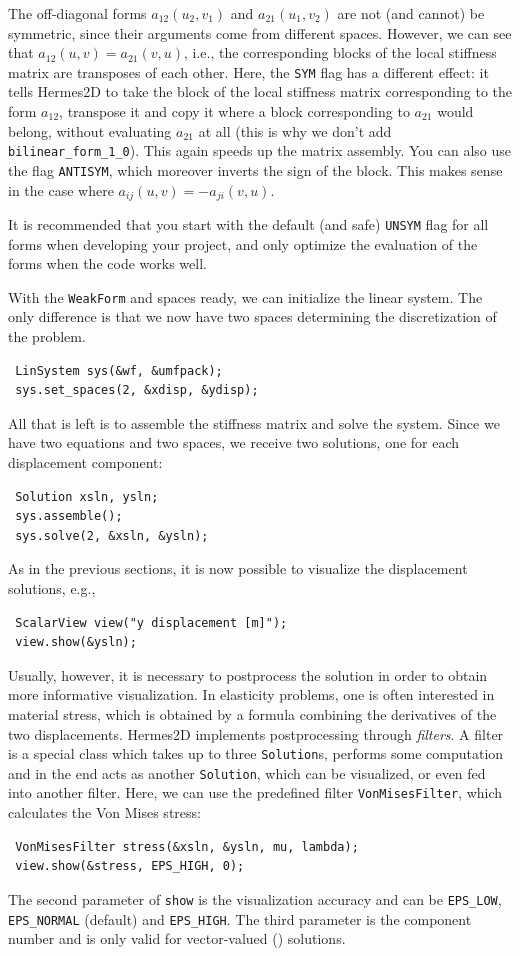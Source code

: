 The off-diagonal forms $a_{12}(u_2, v_1)$ and $a_{21}(u_1, v_2)$ are not
(and cannot) be symmetric, since their arguments come from different spaces.
However, we can see that $a_{12}(u, v) = a_{21}(v, u)$, i.e., the corresponding blocks
of the local stiffness matrix are transposes of each other. Here, the {\tt SYM} flag
has a different effect: it tells Hermes2D to take the block of the local stiffness
matrix corresponding to the form $a_{12}$, transpose it and copy it where a block
corresponding to $a_{21}$ would belong, without evaluating $a_{21}$ at all (this is why
we don't add {\tt bilinear\_form\_1\_0}). This again speeds up the matrix assembly.
You can also use the flag {\tt ANTISYM}, which moreover inverts the sign of the block.
This makes sense in the case where $a_{ij}(u, v) = -a_{ji}(v, u)$.

It is recommended that you start with the default (and safe) {\tt UNSYM} flag for all
forms when developing your project, and only optimize the evaluation of the forms when 
the code works well.

With the {\tt WeakForm} and spaces ready, we can initialize the linear system.
The only difference is that we now have two spaces determining the discretization
of the problem.

\begin{lstlisting}
 LinSystem sys(&wf, &umfpack);
 sys.set_spaces(2, &xdisp, &ydisp);
\end{lstlisting}

All that is left is to assemble the stiffness matrix and solve the system.
Since we have two equations and two spaces, we receive two solutions, one for each
displacement component:
\begin{lstlisting}
 Solution xsln, ysln;
 sys.assemble();
 sys.solve(2, &xsln, &ysln);
\end{lstlisting}

\smallskip As in the previous sections, it is now possible to visualize the displacement
solutions, e.g.,
\begin{lstlisting}
 ScalarView view("y displacement [m]");
 view.show(&ysln);
\end{lstlisting}
Usually, however, it is necessary to postprocess the solution in order to obtain more
informative visualization. In elasticity problems, one is often interested in material
stress, which is obtained by a formula combining the derivatives of the two displacements. 
Hermes2D implements postprocessing through \emph{filters}. A filter is a special class
which takes up to three \verb"Solution"s, performs some computation and in the end acts
as another \verb"Solution", which can be visualized, or even fed into another filter.
Here, we can use the predefined filter \verb"VonMisesFilter", which calculates the 
Von Mises stress:
\begin{lstlisting}
 VonMisesFilter stress(&xsln, &ysln, mu, lambda);
 view.show(&stress, EPS_HIGH, 0);
\end{lstlisting}
The second parameter of \verb"show" is the visualization accuracy and can be
\verb"EPS_LOW", \verb"EPS_NORMAL" (default) and \verb"EPS_HIGH". The third parameter is
the component number and is only valid for vector-valued (\Hcurl) solutions.

